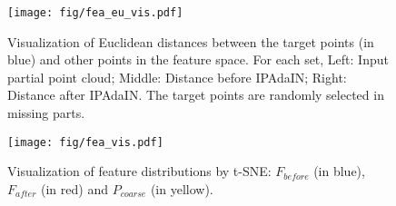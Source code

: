 \begin{figure}[h]
  \centering
  \texttt{[image: fig/fea\_eu\_vis.pdf]}
  \caption{Visualization of Euclidean distances between the target points (in blue) and other points in the feature space. For each set, Left: Input partial point cloud; Middle: Distance before IPAdaIN; Right: Distance after IPAdaIN. The target points are randomly selected in missing parts.}
  \label{fig:feaeuvis}
\end{figure} 
\begin{figure}[h]
  \centering
  \texttt{[image: fig/fea\_vis.pdf]}
  \caption{Visualization of feature distributions by t-SNE: $F_{before}$ (in blue), $F_{after}$ (in red) and $P_{coarse}$ (in yellow).}
  \label{fig:feavis}
\end{figure} 

